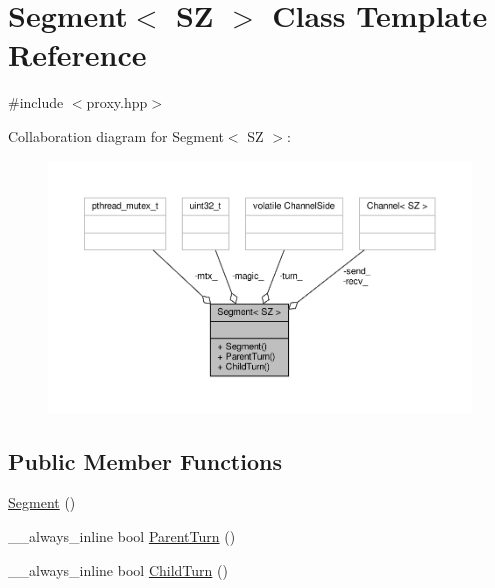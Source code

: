 \hypertarget{classSegment}{}\section{Segment$<$ SZ $>$ Class Template Reference}
\label{classSegment}


{\ttfamily \#include $<$proxy.\+hpp$>$}



Collaboration diagram for Segment$<$ SZ $>$\+:
\nopagebreak
\begin{figure}[H]
\begin{center}
\leavevmode
\includegraphics[width=350pt]{classSegment__coll__graph}
\end{center}
\end{figure}
\subsection*{Public Member Functions}
\begin{DoxyCompactItemize}
\item 
\hyperlink{classSegment_a9712a89eb6463d5ee551c2f60e30bd96}{Segment} ()
\item 
\+\_\+\+\_\+always\+\_\+inline bool \hyperlink{classSegment_a938f93ce0080d9c1b6098e38723aa52f}{Parent\+Turn} ()
\item 
\+\_\+\+\_\+always\+\_\+inline bool \hyperlink{classSegment_a502076154e0aaf26e1c67d8b37397b83}{Child\+Turn} ()
\end{DoxyCompactItemize}
